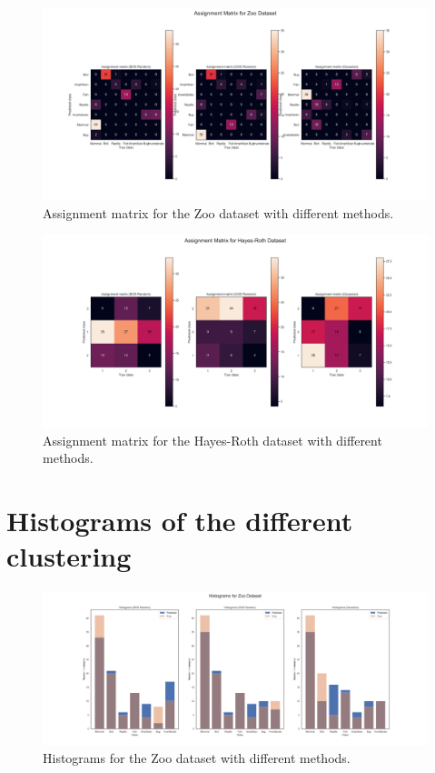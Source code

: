 \documentclass[a4paper,12pt]{article}
\begin{document}
\begin{figure}[H]
    \centering
    \includegraphics[width=\linewidth]{Attachments/assignment_matrix_zoo.png}
    \caption{Assignment matrix for the Zoo dataset with different methods.}
    \label{fig:assign_zoo}
\end{figure}

\begin{figure}[H]
    \centering
    \includegraphics[width=\linewidth]{Attachments/assignment_matrix_hayes-roth.png}
    \caption{Assignment matrix for the Hayes-Roth dataset with different methods.}
    \label{fig:assign_hr}
\end{figure}

\section{Histograms of the different clustering}
\label{sec:appendix_hist}

\begin{figure}[H]
    \centering
    \includegraphics[width=\linewidth]{Attachments/histograms_zoo.png}
    \caption{Histograms for the Zoo dataset with different methods.}
    \label{fig:hist_zoo}
\end{figure}
\end{document}
